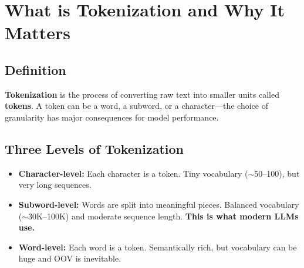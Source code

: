 \documentclass[11pt,a4paper]{article}
\begin{document}
\section{What is Tokenization and Why It Matters}

\subsection{Definition}

\textbf{Tokenization} is the process of converting raw text into smaller units called \textbf{tokens}. A token can be a word, a subword, or a character---the choice of granularity has major consequences for model performance.

\subsection{Three Levels of Tokenization}

\begin{center}
\end{center}

\begin{itemize}[leftmargin=1.5em]
    \item \textbf{Character-level:} Each character is a token. Tiny vocabulary ($\sim$50--100), but very long sequences.
    \item \textbf{Subword-level:} Words are split into meaningful pieces. Balanced vocabulary ($\sim$30K--100K) and moderate sequence length. \textbf{This is what modern LLMs use.}
    \item \textbf{Word-level:} Each word is a token. Semantically rich, but vocabulary can be huge and OOV is inevitable.
\end{itemize}
\end{document}
